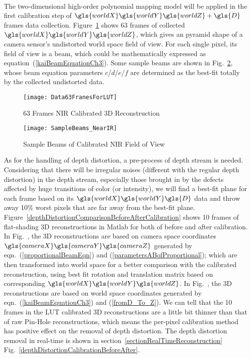 \\\indent
%
The two-dimensional high-order polynomial mapping model will be applied in the first calibration step of \(\gls{worldX} \gls{worldY} \gls{worldZ}+\gls{D}\) frames data collection. Figure~\ref{Data63FranesForLUT} shows 63 frames of collected \(\gls{worldX} \gls{worldY} \gls{worldZ}\), which gives an pyramid shape of a camera sensor's undistorted world space field of view. For each single pixel, its field of view is a beam, which could be mathematically expressed as equation~(\ref{kaiBeamEquationCh3}). Some sample beams are shown in Fig.~\ref{SampleBeams_NearIR}, whose beam equation parameters \(c\)/\(d\)/\(e\)/\(f\) are determined as the best-fit totally by the collected undistorted data. 
\begin{figure}[t]
\centering
\texttt{[image: Data63FranesForLUT]}
\caption{63 Frames \gls{NIR} Calibrated \gls{3D} Reconstruction}
\label{Data63FranesForLUT}
\end{figure}%
%
%
\begin{figure}[t]
\centering
\texttt{[image: SampleBeams\_NearIR]}
\caption{Sample Beams of Calibrated \gls{NIR} Field of View}
\label{SampleBeams_NearIR}
\end{figure}
%
As for the handling of depth distortion, a pre-process of depth stream is needed. Considering that there will be irregular noises (different with the regular depth distortion) in the depth stream, especially those brought in by the defects affected by huge transitions of color (or intensity), we will find a best-fit plane for each frame based on its \(\gls{worldX} \gls{worldY} \gls{D}\) data and throw away 10\% worst pixels that are far away from the best-fit plane. Figure~\ref{depthDistortionComparisonBeforeAfterCalibration} shows 10 frames of flat-shading 3D reconstructions in Matlab for both of before and after calibration. In Fig.~, the 3D reconstructions are based on camera space coordinates \(\gls{cameraX} \gls{cameraY} \gls{cameraZ}\) generated by eqn.~(\ref{proportionalBeamEqn}) and (\ref{parametersABofProportional}); which are then transformed into world space for a better comparison with the calibrated reconstruction, using best fit rotation and translation matrix based on corresponding \(\gls{worldX} \gls{worldY} \gls{worldZ}\). In Fig.~, the 3D reconstructions are based on world space coordinates generated by eqn.~(\ref{kaiBeamEquationCh3}) and (\ref{fromD_To_Z}). We can tell that the 10 frames in the LUT calibrated 3D reconstructions are a little bit thinner than that of raw Pin-Hole reconstructions, which means the per-pixel calibration method has positive effect on the removal of depth distortion. The depth distortion removal in real-time is shown in section~\ref{sectionRealTimeReconstruction} Fig.~\ref{depthDistortionCalibrationBeforeAfter}.


